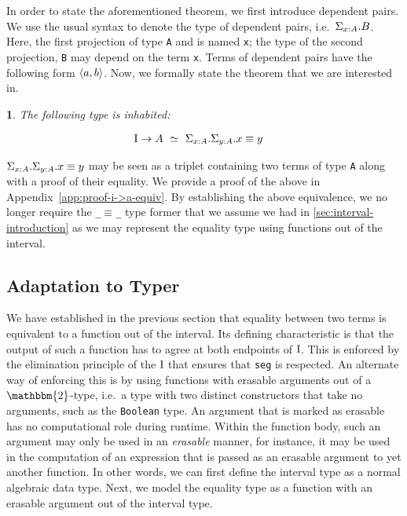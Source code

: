 \documentclass[12pt,twoside,maitrise]{dms}
\newtheorem{theo}[cor]{\theoremname}
\theoremstyle{definition}
\numberwithin{equation}{section}
\numberwithin{table}{chapter}
\numberwithin{figure}{chapter}
\newcommand\id[1] {\texttt{#1}}
\newcommand\fn[1] {\texttt{#1}}
\begin{document}
In order to state the aforementioned theorem, we first introduce dependent
pairs. We use the usual syntax to denote the type of dependent pairs,
i.e.\ $\Sigma_{\oftype{x}{A}}. B$. Here, the first projection of type \id{A} and
is named \id{x}; the type of the second projection, \id{B} may depend on the
term \id{x}. Terms of dependent pairs have the following form $\braket{a, b}$.
Now, we formally state the theorem that we are interested in.

\begin{theo}\label{theo:i->a-equiv}
The following type is inhabited:

\begin{align}
  & \bI \rightarrow A \ \simeq \ \Sigma_{\oftype{x}{A}} . \Sigma_{\oftype{y}{A}} . \eqtype{x}{y}\nonumber
\end{align}

\end{theo}

$\Sigma_{\oftype{x}{A}} . \Sigma_{\oftype{y}{A}} . \eqtype{x}{y}$ may be seen as
a triplet containing two terms of type \id{A} along with a proof of their
equality. We provide a proof of the above in
Appendix~\ref{app:proof-i->a-equiv}. By establishing the above equivalence, we
no longer require the \fn{_$\equiv$_} type former that we assume we had in
\autoref{sec:interval-introduction} as we may represent the equality type using
functions out of the interval.

\subsection{Adaptation to Typer}\label{sec:eq-justification}
We have established in the previous section that equality between two terms is
equivalent to a function out of the interval. Its defining characteristic is
that the output of such a function has to agree at both endpoints of $\mathrm{I}$. This
is enforced by the elimination principle of the $\mathrm{I}$ that ensures that \id{seg}
is respected. An alternate way of enforcing this is by using functions with
erasable arguments out of a $\mathbbm{2}$-type, i.e.\ a type with two distinct
constructors that take no arguments, such as the \id{Boolean} type. An argument
that is marked as erasable has no computational role during runtime. Within the
function body, such an argument may only be used in an \emph{erasable} manner,
for instance, it may be used in the computation of an expression that is passed
as an erasable argument to yet another function. In other words, we can first
define the interval type as a normal algebraic data type. Next, we model the
equality type as a function with an erasable argument out of the interval type.
\end{document}
